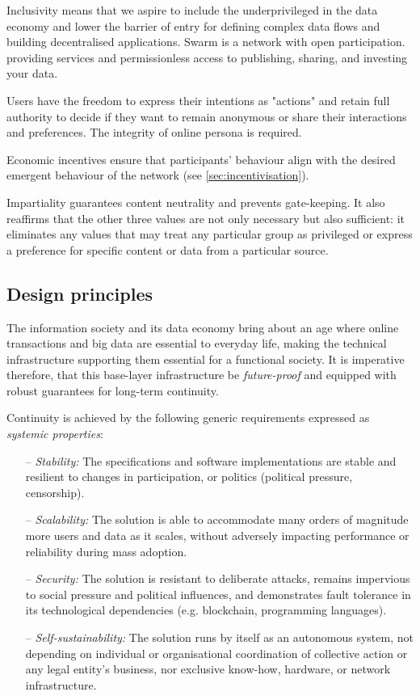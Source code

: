 Inclusivity means that we aspire to include the underprivileged in the data economy and lower the barrier of entry for defining complex data flows and building decentralised applications. Swarm is a network with open participation. providing services and permissionless access to publishing, sharing, and investing your data.

Users have the freedom to express their intentions as "actions" and retain full authority to decide if they want to remain anonymous or share their interactions and preferences. The integrity of online persona is required. 

Economic incentives ensure that participants' behaviour align with the desired emergent behaviour of the network (see \ref{sec:incentivisation}). 

Impartiality guarantees content neutrality and prevents gate-keeping. It also reaffirms that the other three values are not only necessary but also sufficient: it eliminates any values that may treat any particular group as privileged or express a preference for specific content or data from a particular source. 

\subsection{Design principles \statusorange}\label{sec:design-principles}
 

The information society and its data economy bring about an age where online transactions and big data are essential to everyday life, making the technical infrastructure supporting them essential for a functional society. It is imperative therefore, that this base-layer infrastructure be \emph{future-proof} and equipped with robust guarantees for long-term continuity. 

Continuity is achieved by the following generic requirements expressed as \emph{systemic properties}:

\begin{itemize}[noitemsep]
\item[--] \emph{Stability:} The specifications and software implementations are stable and resilient to changes in participation, or politics (political pressure, censorship).
\item[--] \emph{Scalability:} The solution is able to accommodate many orders of magnitude more users and data as it scales, without adversely impacting performance or reliability during mass adoption.  
\item[--] \emph{Security:} The solution is resistant to deliberate attacks, remains impervious to social pressure and political influences, and demonstrates fault tolerance in its technological dependencies (e.g. blockchain, programming languages). 
\item[--] \emph{Self-sustainability:} The solution runs by itself as an autonomous system, not depending on individual or organisational coordination of collective action or any legal entity's business, nor exclusive know-how, hardware, or network infrastructure. 
\end{itemize}




